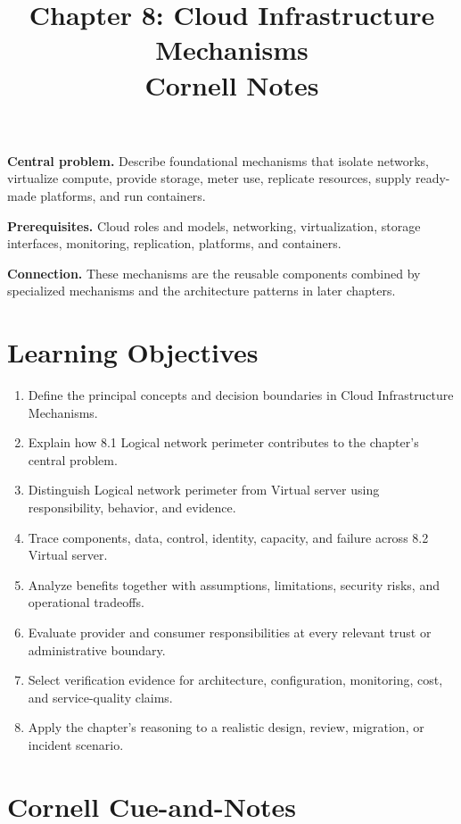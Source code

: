 \documentclass[11pt]{article}
\title{Chapter 8: Cloud Infrastructure Mechanisms\\[2mm]\large Cornell Notes}
\author{}
\date{}
\begin{document}
\maketitle
\thispagestyle{fancy}
\vspace{-1.5em}
\begin{orientationbox}
\textbf{Central problem.} Describe foundational mechanisms that isolate networks, virtualize compute, provide storage, meter use, replicate resources, supply ready-made platforms, and run containers.\par\smallskip
\textbf{Prerequisites.} Cloud roles and models, networking, virtualization, storage interfaces, monitoring, replication, platforms, and containers.\par\smallskip
\textbf{Connection.} These mechanisms are the reusable components combined by specialized mechanisms and the architecture patterns in later chapters.
\end{orientationbox}
\section{Learning Objectives}
\begin{enumerate}
\item Define the principal concepts and decision boundaries in Cloud Infrastructure Mechanisms.
\item Explain how 8.1 Logical network perimeter contributes to the chapter's central problem.
\item Distinguish Logical network perimeter from Virtual server using responsibility, behavior, and evidence.
\item Trace components, data, control, identity, capacity, and failure across 8.2 Virtual server.
\item Analyze benefits together with assumptions, limitations, security risks, and operational tradeoffs.
\item Evaluate provider and consumer responsibilities at every relevant trust or administrative boundary.
\item Select verification evidence for architecture, configuration, monitoring, cost, and service-quality claims.
\item Apply the chapter's reasoning to a realistic design, review, migration, or incident scenario.
\end{enumerate}
\section{Cornell Cue-and-Notes}
\end{document}
